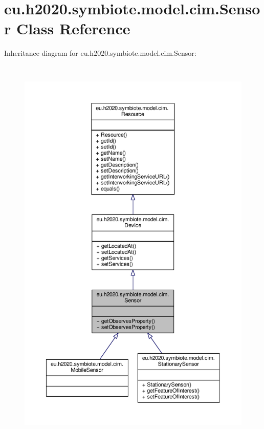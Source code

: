 \hypertarget{classeu_1_1h2020_1_1symbiote_1_1model_1_1cim_1_1Sensor}{}\section{eu.\+h2020.\+symbiote.\+model.\+cim.\+Sensor Class Reference}
\label{classeu_1_1h2020_1_1symbiote_1_1model_1_1cim_1_1Sensor}


Inheritance diagram for eu.\+h2020.\+symbiote.\+model.\+cim.\+Sensor\+:\nopagebreak
\begin{figure}[H]
\begin{center}
\leavevmode
\includegraphics[height=550pt]{classeu_1_1h2020_1_1symbiote_1_1model_1_1cim_1_1Sensor__inherit__graph}
\end{center}
\end{figure}


